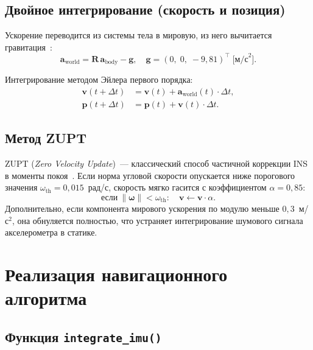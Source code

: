 \subsection{Двойное интегрирование (скорость и позиция)}
 
Ускорение переводится из системы тела в мировую, из него вычитается
гравитация~\cite{groves2013}:
\begin{equation}
    \mathbf{a}_\mathrm{world} = \mathbf{R}\,\mathbf{a}_\mathrm{body}
    - \mathbf{g}, \quad
    \mathbf{g} = (0,\;0,\;{-}9{,}81)^\top \;\text{[м/с}^2\text{]}.
    \label{eq:aworld}
\end{equation}
 
Интегрирование методом Эйлера первого порядка:
\begin{align}
    \mathbf{v}(t{+}\Delta t) &= \mathbf{v}(t) +
        \mathbf{a}_\mathrm{world}(t)\cdot\Delta t, \label{eq:vel}\\
    \mathbf{p}(t{+}\Delta t) &= \mathbf{p}(t) +
        \mathbf{v}(t)\cdot\Delta t. \label{eq:pos}
\end{align}
 
\subsection{Метод ZUPT}
 
ZUPT (\textit{Zero Velocity Update})~--- классический способ частичной
коррекции INS в моменты покоя~\cite{skog2010}. Если норма угловой скорости
опускается ниже порогового значения $\omega_\mathrm{th}=0{,}015$~рад/с,
скорость мягко гасится с коэффициентом $\alpha=0{,}85$:
\begin{equation}
    \text{если}\ \|\bm{\omega}\| < \omega_\mathrm{th}:\quad
    \mathbf{v} \leftarrow \mathbf{v}\cdot\alpha.
    \label{eq:zupt}
\end{equation}
Дополнительно, если компонента мирового ускорения по модулю меньше
$0{,}3$~м/с$^2$, она обнуляется полностью, что устраняет интегрирование
шумового сигнала акселерометра в статике.
 
\newpage
 
\section{Реализация навигационного алгоритма}
 
\subsection{Функция \texttt{integrate\_imu()}}
 
